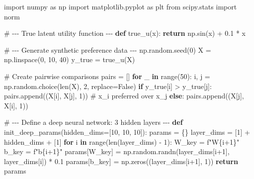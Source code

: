 \documentclass[
  letterpaper,
  numbers=noenddot,
  DIV=11]{scrreprt}
\newenvironment{Shaded}{\begin{snugshade}}{\end{snugshade}}
\newcommand{\BuiltInTok}[1]{\textcolor[rgb]{0.00,0.23,0.31}{#1}}
\newcommand{\CommentTok}[1]{\textcolor[rgb]{0.37,0.37,0.37}{#1}}
\newcommand{\ControlFlowTok}[1]{\textcolor[rgb]{0.00,0.23,0.31}{\textbf{#1}}}
\newcommand{\DecValTok}[1]{\textcolor[rgb]{0.68,0.00,0.00}{#1}}
\newcommand{\FloatTok}[1]{\textcolor[rgb]{0.68,0.00,0.00}{#1}}
\newcommand{\ImportTok}[1]{\textcolor[rgb]{0.00,0.46,0.62}{#1}}
\newcommand{\KeywordTok}[1]{\textcolor[rgb]{0.00,0.23,0.31}{\textbf{#1}}}
\newcommand{\NormalTok}[1]{\textcolor[rgb]{0.00,0.23,0.31}{#1}}
\newcommand{\OperatorTok}[1]{\textcolor[rgb]{0.37,0.37,0.37}{#1}}
\newcommand{\SpecialCharTok}[1]{\textcolor[rgb]{0.37,0.37,0.37}{#1}}
\newcommand{\SpecialStringTok}[1]{\textcolor[rgb]{0.13,0.47,0.30}{#1}}
\newcommand{\VariableTok}[1]{\textcolor[rgb]{0.07,0.07,0.07}{#1}}
\theoremstyle{plain}
\theoremstyle{definition}
\theoremstyle{remark}
\begin{document}
\begin{Shaded}
\begin{Highlighting}[numbers=left,,]
\ImportTok{import}\NormalTok{ numpy }\ImportTok{as}\NormalTok{ np}
\ImportTok{import}\NormalTok{ matplotlib.pyplot }\ImportTok{as}\NormalTok{ plt}
\ImportTok{from}\NormalTok{ scipy.stats }\ImportTok{import}\NormalTok{ norm}

\CommentTok{\# {-}{-}{-} True latent utility function {-}{-}{-}}
\KeywordTok{def}\NormalTok{ true\_u(x):}
    \ControlFlowTok{return}\NormalTok{ np.sin(x) }\OperatorTok{+} \FloatTok{0.1} \OperatorTok{*}\NormalTok{ x}

\CommentTok{\# {-}{-}{-} Generate synthetic preference data {-}{-}{-}}
\NormalTok{np.random.seed(}\DecValTok{0}\NormalTok{)}
\NormalTok{X }\OperatorTok{=}\NormalTok{ np.linspace(}\DecValTok{0}\NormalTok{, }\DecValTok{10}\NormalTok{, }\DecValTok{40}\NormalTok{)}
\NormalTok{y\_true }\OperatorTok{=}\NormalTok{ true\_u(X)}

\CommentTok{\# Create pairwise comparisons}
\NormalTok{pairs }\OperatorTok{=}\NormalTok{ []}
\ControlFlowTok{for}\NormalTok{ \_ }\KeywordTok{in} \BuiltInTok{range}\NormalTok{(}\DecValTok{50}\NormalTok{):}
\NormalTok{    i, j }\OperatorTok{=}\NormalTok{ np.random.choice(}\BuiltInTok{len}\NormalTok{(X), }\DecValTok{2}\NormalTok{, replace}\OperatorTok{=}\VariableTok{False}\NormalTok{)}
    \ControlFlowTok{if}\NormalTok{ y\_true[i] }\OperatorTok{\textgreater{}}\NormalTok{ y\_true[j]:}
\NormalTok{        pairs.append((X[i], X[j], }\DecValTok{1}\NormalTok{))  }\CommentTok{\# x\_i preferred over x\_j}
    \ControlFlowTok{else}\NormalTok{:}
\NormalTok{        pairs.append((X[j], X[i], }\DecValTok{1}\NormalTok{))}

\CommentTok{\# {-}{-}{-} Define a deep neural network: 3 hidden layers {-}{-}{-}}
\KeywordTok{def}\NormalTok{ init\_deep\_params(hidden\_dims}\OperatorTok{=}\NormalTok{[}\DecValTok{10}\NormalTok{, }\DecValTok{10}\NormalTok{, }\DecValTok{10}\NormalTok{]):}
\NormalTok{    params }\OperatorTok{=}\NormalTok{ \{\}}
\NormalTok{    layer\_dims }\OperatorTok{=}\NormalTok{ [}\DecValTok{1}\NormalTok{] }\OperatorTok{+}\NormalTok{ hidden\_dims }\OperatorTok{+}\NormalTok{ [}\DecValTok{1}\NormalTok{]}
    \ControlFlowTok{for}\NormalTok{ i }\KeywordTok{in} \BuiltInTok{range}\NormalTok{(}\BuiltInTok{len}\NormalTok{(layer\_dims) }\OperatorTok{{-}} \DecValTok{1}\NormalTok{):}
\NormalTok{        W\_key }\OperatorTok{=} \SpecialStringTok{f"W}\SpecialCharTok{\{}\NormalTok{i}\OperatorTok{+}\DecValTok{1}\SpecialCharTok{\}}\SpecialStringTok{"}
\NormalTok{        b\_key }\OperatorTok{=} \SpecialStringTok{f"b}\SpecialCharTok{\{}\NormalTok{i}\OperatorTok{+}\DecValTok{1}\SpecialCharTok{\}}\SpecialStringTok{"}
\NormalTok{        params[W\_key] }\OperatorTok{=}\NormalTok{ np.random.randn(layer\_dims[i}\OperatorTok{+}\DecValTok{1}\NormalTok{], layer\_dims[i]) }\OperatorTok{*} \FloatTok{0.1}
\NormalTok{        params[b\_key] }\OperatorTok{=}\NormalTok{ np.zeros((layer\_dims[i}\OperatorTok{+}\DecValTok{1}\NormalTok{], }\DecValTok{1}\NormalTok{))}
    \ControlFlowTok{return}\NormalTok{ params}


\end{Highlighting}
\end{Shaded}
\end{document}

